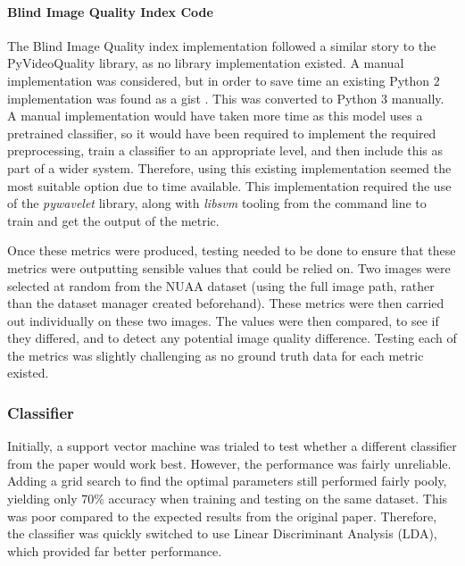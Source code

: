 \documentclass[10pt,a4paper]{article}
\begin{document}
            \paragraph{Blind Image Quality Index Code}
            The Blind Image Quality index implementation followed a similar story to the PyVideoQuality library, as no library implementation existed. A manual implementation was considered, but in order to save time an existing Python 2 implementation was found as a gist \cite{BIQIImplementation}.
            This was converted to Python 3 manually. A manual implementation would have taken more time as this model uses a pretrained classifier, so it would have been required to implement the required preprocessing, train a classifier to an appropriate level,
            and then include this as part of a wider system. Therefore, using this existing implementation seemed the most suitable option due to time available. This implementation required the use of the \emph{pywavelet} library, along with \emph{libsvm} tooling from the command line to train and get the output of the metric.

            

            Once these metrics were produced, testing needed to be done to ensure that these metrics were outputting sensible values that could be relied on.
            Two images were selected at random from the NUAA dataset (using the full image path, rather than the dataset manager created beforehand). These metrics
            were then carried out individually on these two images. The values were then compared, to see if they differed, and to detect any potential image quality difference. 
            Testing each of the metrics was slightly challenging as no ground truth data for each metric existed.


        \subsubsection{Classifier}
            Initially, a support vector machine was trialed to test whether a different classifier from the paper \cite{ImageQualityAssessmentTest} would work best. However,
            the performance was fairly unreliable. Adding a grid search to find the optimal parameters still performed fairly pooly, yielding only 70\% accuracy when training and testing on the same dataset. This was poor compared to the expected results from the original paper. Therefore, the classifier was quickly switched to
            use Linear Discriminant Analysis (LDA), which provided far better performance.
\end{document}
